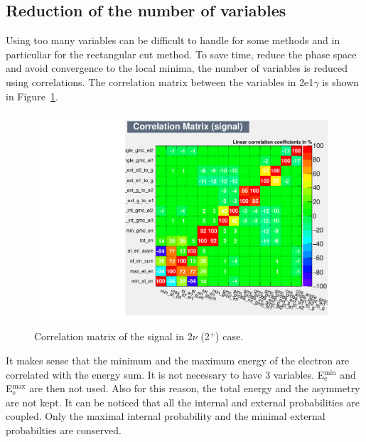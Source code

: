 \documentclass[main.tex]{subfiles}
\begin{document}
\FloatBarrier

\subsection{Reduction of the number of variables}\label{sec:ReductionNumberVariables}


\NI Using too many variables can be difficult to handle for some methods and in particuliar for the rectangular cut method. To save time, reduce the phase space and avoid convergence to the local minima, the number of variables is reduced using correlations. The correlation matrix between the variables in 2e1$\gamma$ is shown in Figure~\ref{CorrelationMatrix}.


\bigskip


\begin{figure} [h!]
\begin{center}
\includegraphics[scale=0.45]{pictures/FinalResults/bb2nu2/150/preselection/CorrelationMatrixBB0nu_2_signal.pdf}
\end{center}
\caption{Correlation matrix of the signal in 2$\nu$ (2$^+$) case.}
\label{CorrelationMatrix}
\end{figure}


\NI It makes sense that the minimum and the maximum energy of the electron are correlated with the energy sum. It is not necessary to have 3 variables. E$_\text{e}^{\text{min}}$ and E$_\text{e}^{\text{max}}$ are then not used. Also for this reason, the total energy and the asymmetry are not kept. It can be noticed that all the internal and external probabilities are coupled. Only the maximal internal probability and the minimal external probabilties are conserved.
\end{document}
